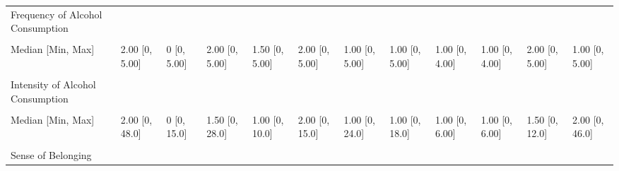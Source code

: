\documentclass[
  single column]{article}
\begin{document}
\begin{landscape}
\begin{longtable}[t]{llllllllllll}
Frequency of Alcohol Consumption &  &  &  &  &  &  &  &  &  &  & \\
\addlinespace
\cellcolor{gray!10}{Mean (SD)} & \cellcolor{gray!10}{2.05 (1.33)} & \cellcolor{gray!10}{0.112 (0.557)} & \cellcolor{gray!10}{2.20 (1.38)} & \cellcolor{gray!10}{1.66 (1.35)} & \cellcolor{gray!10}{1.99 (1.34)} & \cellcolor{gray!10}{1.62 (1.34)} & \cellcolor{gray!10}{1.37 (1.34)} & \cellcolor{gray!10}{1.32 (1.28)} & \cellcolor{gray!10}{1.55 (1.18)} & \cellcolor{gray!10}{2.02 (1.37)} & \cellcolor{gray!10}{1.51 (1.38)}\\
Median [Min, Max] & 2.00 [0, 5.00] & 0 [0, 5.00] & 2.00 [0, 5.00] & 1.50 [0, 5.00] & 2.00 [0, 5.00] & 1.00 [0, 5.00] & 1.00 [0, 5.00] & 1.00 [0, 4.00] & 1.00 [0, 4.00] & 2.00 [0, 5.00] & 1.00 [0, 5.00]\\
\cellcolor{gray!10}{Missing} & \cellcolor{gray!10}{449 (2.1\%)} & \cellcolor{gray!10}{22 (3.3\%)} & \cellcolor{gray!10}{40 (2.9\%)} & \cellcolor{gray!10}{8 (3.0\%)} & \cellcolor{gray!10}{78 (3.9\%)} & \cellcolor{gray!10}{92 (2.5\%)} & \cellcolor{gray!10}{30 (2.7\%)} & \cellcolor{gray!10}{4 (2.9\%)} & \cellcolor{gray!10}{5 (5.7\%)} & \cellcolor{gray!10}{19 (3.3\%)} & \cellcolor{gray!10}{23 (3.1\%)}\\
Intensity of Alcohol Consumption &  &  &  &  &  &  &  &  &  &  & \\
\cellcolor{gray!10}{Mean (SD)} & \cellcolor{gray!10}{2.36 (2.25)} & \cellcolor{gray!10}{0.387 (1.52)} & \cellcolor{gray!10}{1.83 (1.84)} & \cellcolor{gray!10}{1.66 (1.40)} & \cellcolor{gray!10}{2.08 (1.89)} & \cellcolor{gray!10}{1.65 (1.80)} & \cellcolor{gray!10}{1.58 (2.07)} & \cellcolor{gray!10}{1.60 (1.57)} & \cellcolor{gray!10}{1.50 (1.30)} & \cellcolor{gray!10}{1.80 (1.55)} & \cellcolor{gray!10}{2.24 (3.30)}\\
\addlinespace
Median [Min, Max] & 2.00 [0, 48.0] & 0 [0, 15.0] & 1.50 [0, 28.0] & 1.00 [0, 10.0] & 2.00 [0, 15.0] & 1.00 [0, 24.0] & 1.00 [0, 18.0] & 1.00 [0, 6.00] & 1.00 [0, 6.00] & 1.50 [0, 12.0] & 2.00 [0, 46.0]\\
\cellcolor{gray!10}{Missing} & \cellcolor{gray!10}{2766 (12.8\%)} & \cellcolor{gray!10}{345 (52.4\%)} & \cellcolor{gray!10}{168 (12.3\%)} & \cellcolor{gray!10}{57 (21.1\%)} & \cellcolor{gray!10}{279 (13.8\%)} & \cellcolor{gray!10}{647 (17.5\%)} & \cellcolor{gray!10}{235 (21.5\%)} & \cellcolor{gray!10}{26 (19.1\%)} & \cellcolor{gray!10}{17 (19.5\%)} & \cellcolor{gray!10}{75 (13.0\%)} & \cellcolor{gray!10}{159 (21.4\%)}\\
Sense of Belonging &  &  &  &  &  &  &  &  &  &  & \\

\end{longtable}
\end{landscape}
\end{document}
